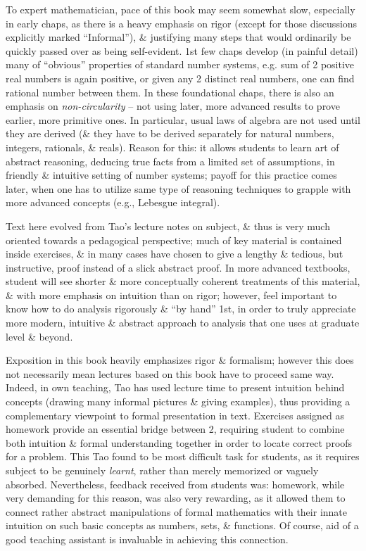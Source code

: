 \documentclass{article}
\begin{document}
\begin{itemize}
	To expert mathematician, pace of this book may seem somewhat slow, especially in early chaps, as there is a heavy emphasis on rigor (except for those discussions explicitly marked ``Informal''), \& justifying many steps that would ordinarily be quickly passed over as being self-evident. 1st few chaps develop (in painful detail) many of ``obvious'' properties of standard number systems, e.g. sum of 2 positive real numbers is again positive, or given any 2 distinct real numbers, one can find rational number between them. In these foundational chaps, there is also an emphasis on {\it non-circularity} -- not using later, more advanced results to prove earlier, more primitive ones. In particular, usual laws of algebra are not used until they are derived (\& they have to be derived separately for natural numbers, integers, rationals, \& reals). Reason for this: it allows students to learn art of abstract reasoning, deducing true facts from a limited set of assumptions, in friendly \& intuitive setting of number systems; payoff for this practice comes later, when one has to utilize same type of reasoning techniques to grapple with more advanced concepts (e.g., Lebesgue integral).
	
	Text here evolved from Tao's lecture notes on subject, \& thus is very much oriented towards a pedagogical perspective; much of key material is contained inside exercises, \& in many cases have chosen to give a lengthy \& tedious, but instructive, proof instead of a slick abstract proof. In more advanced textbooks, student will see shorter \& more conceptually coherent treatments of this material, \& with more emphasis on intuition than on rigor; however, feel important to know how to do analysis rigorously \& ``by hand'' 1st, in order to truly appreciate more modern, intuitive \& abstract approach to analysis that one uses at graduate level \& beyond.
	
	Exposition in this book heavily emphasizes rigor \& formalism; however this does not necessarily mean lectures based on this book have to proceed same way. Indeed, in own teaching, Tao has used lecture time to present intuition behind concepts (drawing many informal pictures \& giving examples), thus providing a complementary viewpoint to formal presentation in text. Exercises assigned as homework provide an essential bridge between 2, requiring student to combine both intuition \& formal understanding together in order to locate correct proofs for a problem. This Tao found to be most difficult task for students, as it requires subject to be genuinely {\it learnt}, rather than merely memorized or vaguely absorbed. Nevertheless, feedback received from students was: homework, while very demanding for this reason, was also very rewarding, as it allowed them to connect rather abstract manipulations of formal mathematics with their innate intuition on such basic concepts as numbers, sets, \& functions. Of course, aid of a good teaching assistant is invaluable in achieving this connection.
	

\end{itemize}
\end{document}
